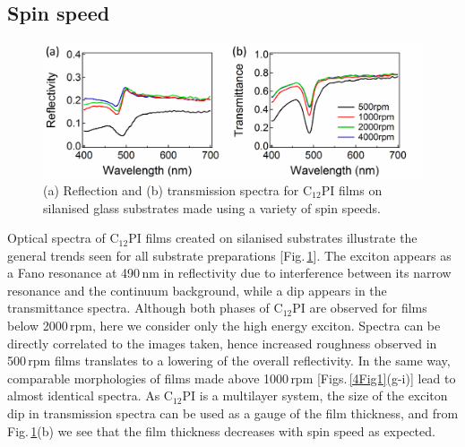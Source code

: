 \subsection{Spin speed}
\begin{figure}[h!]
\centering
\includegraphics[width=\textwidth]{Fig2}
\caption{(a) Reflection and (b) transmission spectra for C$_{12}$PI films on silanised glass substrates made using a variety of spin speeds.}
\label{4Fig2}
\end{figure}
Optical spectra of C$_{12}$PI films created on silanised substrates illustrate the general trends seen for all substrate preparations [Fig.\,\ref{4Fig2}]. The exciton appears as a Fano resonance at 490\,nm in reflectivity due to interference between its narrow resonance and the continuum background, while a dip appears in the transmittance spectra. Although both phases of C$_{12}$PI are observed for films below 2000\,rpm, here we consider only the high energy exciton. Spectra can be directly correlated to the images taken, hence increased roughness observed in 500\,rpm films translates to a lowering of the overall reflectivity. In the same way, comparable morphologies of films made above 1000\,rpm [Figs.\,\ref{4Fig1}(g-i)] lead to almost identical spectra. As C$_{12}$PI is a multilayer system, the size of the exciton dip in transmission spectra can be used as a gauge of the film thickness, and from Fig.\,\ref{4Fig2}(b) we see that the film thickness decreases with spin speed as expected.

